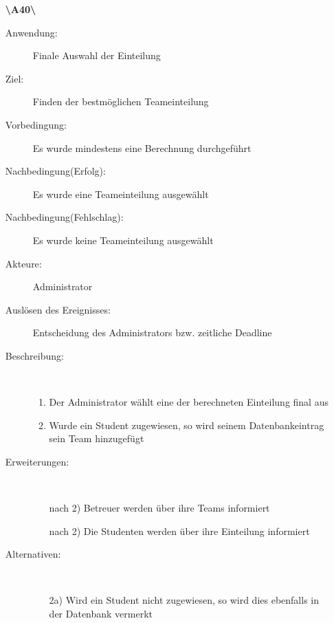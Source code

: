 \documentclass[parskip=full]{scrartcl}
\begin{document}
\begin{enumerate}
  \item[\textbf{\textbackslash A40\textbackslash}] \begin{description}
  \item[Anwendung:] Finale Auswahl der Einteilung
  \item[Ziel:] Finden der bestmöglichen Teameinteilung
  	\item[Vorbedingung:] Es wurde mindestens eine Berechnung durchgeführt
  	\item[Nachbedingung(Erfolg):] Es wurde eine Teameinteilung ausgewählt
  	\item[Nachbedingung(Fehlschlag):] Es wurde keine Teameinteilung ausgewählt
  	\item[Akteure:] Administrator
  	\item[Auslösen des Ereignisses:] Entscheidung des Administrators bzw.
  	zeitliche Deadline
  	\item[Beschreibung:]~
  	\begin{enumerate}[1.]
  	  \item Der Administrator wählt eine der berechneten Einteilung final aus
  	  \item Wurde ein Student zugewiesen, so wird seinem Datenbankeintrag sein
  	  Team hinzugefügt
  	\end{enumerate}
  	\item[Erweiterungen:]~
  	\begin{enumerate}
  	  \item[nach 2)] Betreuer werden über ihre Teams informiert
  	  \item[nach 2)] Die Studenten werden über ihre Einteilung informiert
  	 \end{enumerate}
  	\item[Alternativen:] ~
  	\begin{enumerate}
  	  \item[2a)] Wird ein Student nicht zugewiesen, so wird dies ebenfalls in der
  	  Datenbank vermerkt
  	 \end{enumerate}  
  \end{description}
  \pagebreak
  

\end{enumerate}
\end{document}
